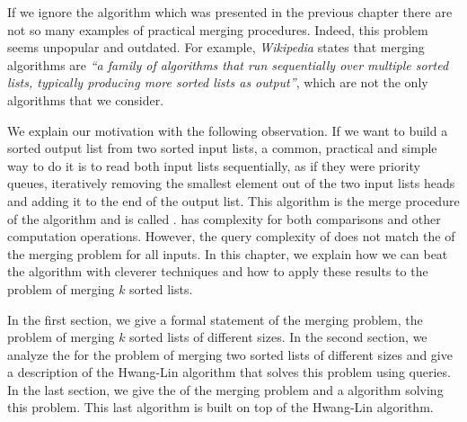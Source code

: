 \label{tree:merging:intro}

If we ignore the \mergesort algorithm which was presented in
the previous chapter there are not so many examples of practical merging
procedures. Indeed, this problem seems unpopular and outdated. For example,
\emph{Wikipedia} states that merging algorithms are \emph{``a family of algorithms
that run sequentially over multiple sorted lists, typically producing more
sorted lists as output''}, which are not the only algorithms that we
consider.

We explain our motivation with the following observation.
If we want to build a sorted output list from two sorted input lists, a
common, practical and simple way to do it is to read both input lists
sequentially, as if they were priority queues, iteratively removing the
smallest element out of the two input lists heads and adding it to the end
of the output list. This algorithm is the merge procedure of the \mergesort
algorithm and is called \tapemerge. \tapemerge has  complexity for
both comparisons and other computation operations. However, the query
complexity of \tapemerge does not match the \ITLB of the merging problem for all
inputs. In this chapter, we explain how we can beat the \tapemerge algorithm
with cleverer techniques and how to apply these results to the problem of
merging \(k\) sorted lists.

In the first section, we give a formal statement of the merging problem, \ie
the problem of merging \(k\) sorted lists of different sizes. In the second
section, we analyze the \ITLB for the problem of merging two sorted lists of
different sizes and give a description of the Hwang-Lin algorithm
\cite{DBLP:journals/siamcomp/HwangL72} that solves this problem using
\BigO{\ITLB} queries. In the last section, we give the \ITLB of the merging
problem and a \BigO{\ITLB} algorithm solving this problem. This last
algorithm is built on top of the Hwang-Lin algorithm.
